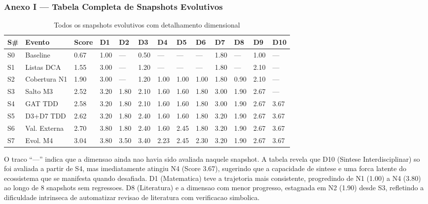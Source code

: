 \subsubsection{Anexo I --- Tabela Completa de Snapshots Evolutivos}

\begin{table}[H]\centering\footnotesize
\caption{Todos os snapshots evolutivos com detalhamento dimensional}
\label{tab:snapshots-all}
\begin{tabular}{p{}p{}p{}p{}p{}p{}p{}p{}p{}p{}p{}p{}p{}}
\toprule
\textbf{S\#} & \textbf{Evento} & \textbf{Score} & \textbf{D1} & \textbf{D2} &
\textbf{D3} & \textbf{D4} & \textbf{D5} & \textbf{D6} & \textbf{D7} &
\textbf{D8} & \textbf{D9} & \textbf{D10} \\
\midrule
S0 & Baseline & 0.67 & 1.00 & --- & 0.50 & --- & --- & --- & 1.80 & --- & 1.00 & --- \\
S1 & Listas DCA & 1.55 & 3.00 & --- & 1.20 & --- & --- & --- & 1.80 & --- & 2.10 & --- \\
S2 & Cobertura N1 & 1.90 & 3.00 & --- & 1.20 & 1.00 & 1.00 & 1.00 & 1.80 & 0.90 & 2.10 & --- \\
S3 & Salto M3 & 2.52 & 3.20 & 1.80 & 2.10 & 1.60 & 1.60 & 1.80 & 3.00 & 1.90 & 2.67 & --- \\
S4 & GAT TDD & 2.58 & 3.20 & 1.80 & 2.10 & 1.60 & 1.60 & 1.80 & 3.00 & 1.90 & 2.67 & 3.67 \\
S5 & D3+D7 TDD & 2.62 & 3.20 & 1.80 & 2.40 & 1.60 & 1.60 & 1.80 & 3.20 & 1.90 & 2.67 & 3.67 \\
S6 & Val. Externa & 2.70 & 3.80 & 1.80 & 2.40 & 1.60 & 2.45 & 1.80 & 3.20 & 1.90 & 2.67 & 3.67 \\
S7 & Evol. M4 & 3.04 & 3.80 & 3.50 & 3.40 & 2.23 & 2.45 & 2.30 & 3.20 & 1.90 & 2.67 & 3.67 \\
\bottomrule
\end{tabular}
\end{table}

O traco ``---'' indica que a dimensao ainda nao havia sido avaliada
naquele snapshot. A tabela revela que D10 (Sintese Interdisciplinar) so
foi avaliada a partir de S4, mas imediatamente atingiu N4 (Score 3.67),
sugerindo que a capacidade de sintese e uma forca latente do ecossistema
que se manifesta quando desafiada. D1 (Matematica) teve a trajetoria mais
consistente, progredindo de N1 (1.00) a N4 (3.80) ao longo de 8 snapshots
sem regressoes. D8 (Literatura) e a dimensao com menor progresso,
estagnada em N2 (1.90) desde S3, refletindo a dificuldade intrinseca de
automatizar revisao de literatura com verificacao simbolica.

